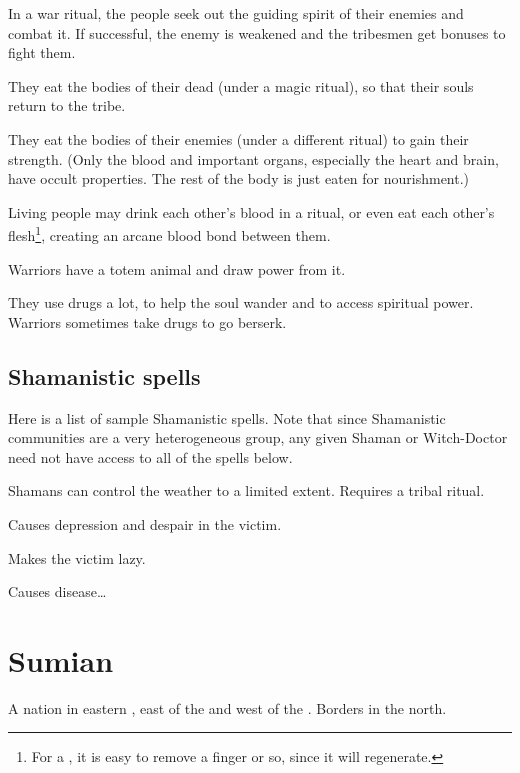 In a war ritual, the people seek out the guiding spirit of their enemies and combat it. If successful, the enemy is weakened and the tribesmen get bonuses to fight them. 

They eat the bodies of their dead (under a magic ritual), so that their souls return to the tribe. 

They eat the bodies of their enemies (under a different ritual) to gain their strength. (Only the blood and important organs, especially the heart and brain, have occult properties. The rest of the body is just eaten for nourishment.) 

Living people may drink each other's blood in a ritual, or even eat each other's flesh\footnote{For a \meccaran, it is easy to remove a finger or so, since it will regenerate.}, creating an arcane blood bond between them. 

Warriors have a totem animal and draw power from it. 

They use drugs a lot, to help the soul wander and to access spiritual power. Warriors sometimes take drugs to go berserk. 









\subsection{Shamanistic spells}

Here is a list of sample Shamanistic spells. Note that since Shamanistic communities are a very heterogeneous group, any given Shaman or Witch-Doctor need not have access to all of the spells below. 

Shamans can control the weather to a limited extent. Requires a tribal ritual. 

Causes depression and despair in the victim. 

Makes the victim lazy. 

Causes disease\ldots{} 















\section{Sumian}
A nation in eastern , east of the  and west of the . 
Borders  in the north. 















